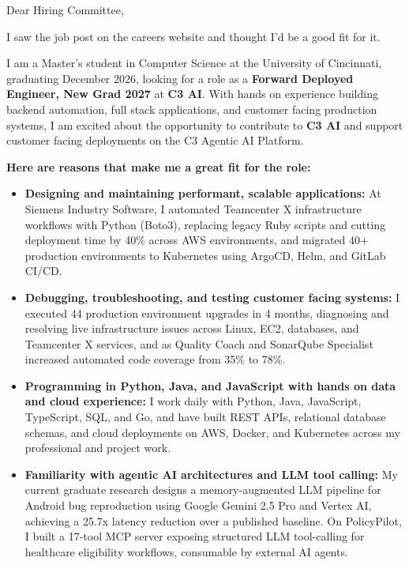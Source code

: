 \documentclass[11pt]{letter}
\date{}
\begin{document}
\begin{letter}{}

\opening{Dear Hiring Committee,}

I saw the job post on the careers website and thought I'd be a good fit for it.

I am a Master's student in Computer Science at the University of Cincinnati, graduating December 2026, looking for a role as a \textbf{Forward Deployed Engineer, New Grad 2027} at \textbf{C3 AI}. With hands on experience building backend automation, full stack applications, and customer facing production systems, I am excited about the opportunity to contribute to \textbf{C3 AI} and support customer facing deployments on the C3 Agentic AI Platform.

\textbf{Here are reasons that make me a great fit for the role:}

\begin{itemize}[leftmargin=*, itemsep=0.45em]
    \item \textbf{Designing and maintaining performant, scalable applications:} At Siemens Industry Software, I automated Teamcenter X infrastructure workflows with Python (Boto3), replacing legacy Ruby scripts and cutting deployment time by 40\% across AWS environments, and migrated 40+ production environments to Kubernetes using ArgoCD, Helm, and GitLab CI/CD.

    \item \textbf{Debugging, troubleshooting, and testing customer facing systems:} I executed 44 production environment upgrades in 4 months, diagnosing and resolving live infrastructure issues across Linux, EC2, databases, and Teamcenter X services, and as Quality Coach and SonarQube Specialist increased automated code coverage from 35\% to 78\%.

    \item \textbf{Programming in Python, Java, and JavaScript with hands on data and cloud experience:} I work daily with Python, Java, JavaScript, TypeScript, SQL, and Go, and have built REST APIs, relational database schemas, and cloud deployments on AWS, Docker, and Kubernetes across my professional and project work.

    \item \textbf{Familiarity with agentic AI architectures and LLM tool calling:} My current graduate research designs a memory-augmented LLM pipeline for Android bug reproduction using Google Gemini 2.5 Pro and Vertex AI, achieving a 25.7x latency reduction over a published baseline. On PolicyPilot, I built a 17-tool MCP server exposing structured LLM tool-calling for healthcare eligibility workflows, consumable by external AI agents.


\end{itemize}
\end{letter}
\end{document}
